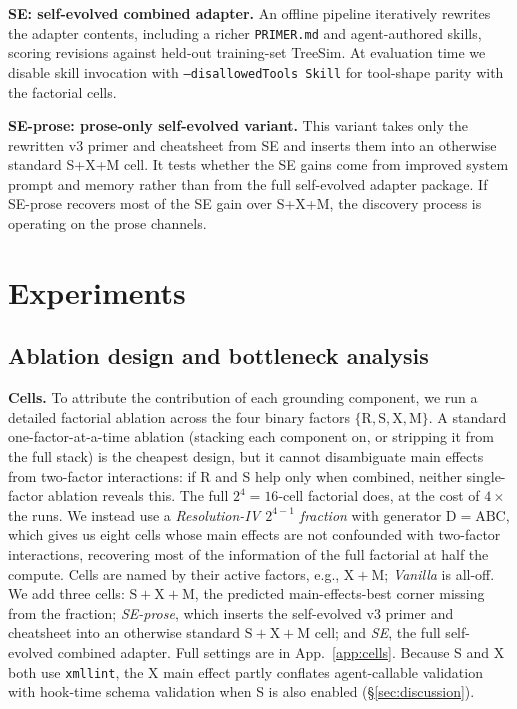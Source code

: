 \documentclass{article}
\begin{document}
\textbf{SE: self-evolved combined adapter.} An offline pipeline iteratively rewrites the adapter contents, including a richer \texttt{PRIMER.md} and agent-authored skills, scoring revisions against held-out training-set TreeSim. At evaluation time we disable skill invocation with \texttt{--disallowedTools Skill} for tool-shape parity with the factorial cells.

\textbf{SE-prose: prose-only self-evolved variant.} This variant takes only the rewritten v3 primer and cheatsheet from SE and inserts them into an otherwise standard S+X+M cell. It tests whether the SE gains come from improved system prompt and memory rather than from the full self-evolved adapter package. If SE-prose recovers most of the SE gain over S+X+M, the discovery process is operating on the prose channels.

\section{Experiments}
\label{sec:eval}

\subsection{Ablation design and bottleneck analysis}
\label{subsec:cells}

\textbf{Cells.} To attribute the contribution of each grounding component, we run a detailed factorial ablation across the four binary factors $\{\mathrm{R, S, X, M}\}$. A standard one-factor-at-a-time ablation (stacking each component on, or stripping it from the full stack) is the cheapest design, but it cannot disambiguate main effects from two-factor interactions: if R and S help only when combined, neither single-factor ablation reveals this. The full $2^4 = 16$-cell factorial does, at the cost of $4{\times}$ the runs. We instead use a \emph{Resolution-IV $2^{4-1}$ fraction} with generator $\mathrm{D}{=}\mathrm{ABC}$, which gives us eight cells whose main effects are not confounded with two-factor interactions, recovering most of the information of the full factorial at half the compute. Cells are named by their active factors, e.g., $\mathrm{X+M}$; \emph{Vanilla} is all-off. We add three cells: $\mathrm{S+X+M}$, the predicted main-effects-best corner missing from the fraction; \emph{SE-prose}, which inserts the self-evolved v3 primer and cheatsheet into an otherwise standard $\mathrm{S+X+M}$ cell; and \emph{SE}, the full self-evolved combined adapter. Full settings are in App.~\ref{app:cells}. Because S and X both use \texttt{xmllint}, the X main effect partly conflates agent-callable validation with hook-time schema validation when S is also enabled (\S\ref{sec:discussion}).
\end{document}
